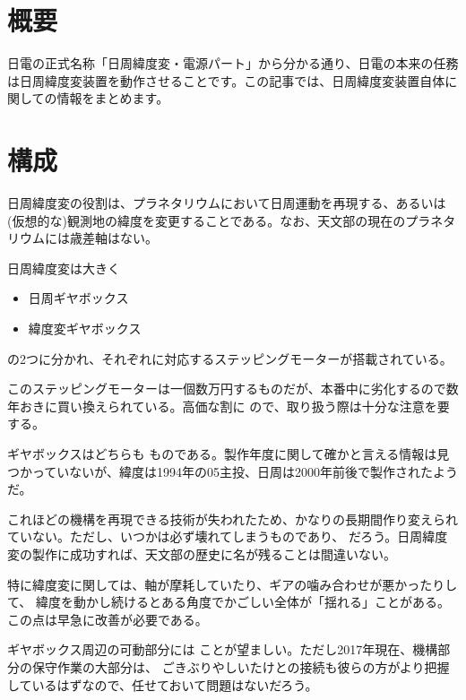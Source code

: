 \documentclass[letterpaper,10pt,dvipdfmx]{sphinxmanual}
\begin{document}
\section{概要}
\label{\detokenize{nissyu-idohen/kikou:id2}}
日電の正式名称「日周緯度変・電源パート」から分かる通り、日電の本来の任務は日周緯度変装置を動作させることです。この記事では、日周緯度変装置自体に関しての情報をまとめます。


\section{構成}
\label{\detokenize{nissyu-idohen/kikou:id3}}
日周緯度変の役割は、プラネタリウムにおいて日周運動を再現する、あるいは(仮想的な)観測地の緯度を変更することである。なお、天文部の現在のプラネタリウムには歳差軸はない。

日周緯度変は大きく
\begin{itemize}
\item {} 
日周ギヤボックス

\item {} 
緯度変ギヤボックス

\end{itemize}

の2つに分かれ、それぞれに対応するステッピングモーターが搭載されている。

このステッピングモーターは一個数万円するものだが、本番中に劣化するので数年おきに買い換えられている。高価な割に
ので、取り扱う際は十分な注意を要する。

ギヤボックスはどちらも
ものである。製作年度に関して確かと言える情報は見つかっていないが、緯度は1994年の05主投、日周は2000年前後で製作されたようだ。

これほどの機構を再現できる技術が失われたため、かなりの長期間作り変えられていない。ただし、いつかは必ず壊れてしまうものであり、
だろう。日周緯度変の製作に成功すれば、天文部の歴史に名が残ることは間違いない。

特に緯度変に関しては、軸が摩耗していたり、ギアの噛み合わせが悪かったりして、
緯度を動かし続けるとある角度でかごしい全体が「揺れる」ことがある。この点は早急に改善が必要である。

ギヤボックス周辺の可動部分には
ことが望ましい。ただし2017年現在、機構部分の保守作業の大部分は、
ごきぶりやしいたけとの接続も彼らの方がより把握しているはずなので、任せておいて問題はないだろう。
\end{document}
